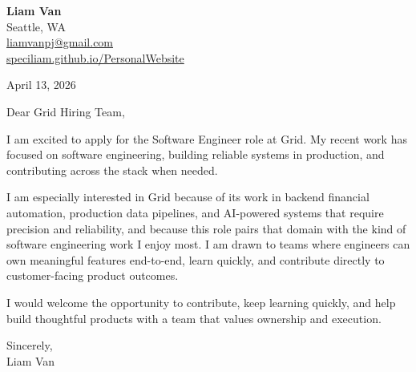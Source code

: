 \documentclass[letterpaper,11pt]{article}
\begin{document}
\begin{flushleft}
\textbf{\Large Liam Van} \\
Seattle, WA \\
\href{mailto:liamvanpj@gmail.com}{liamvanpj@gmail.com} \\
\href{https://speciliam.github.io/PersonalWebsite}{speciliam.github.io/PersonalWebsite}
\end{flushleft}

April 13, 2026

\noindent Dear Grid Hiring Team,

\noindent I am excited to apply for the Software Engineer role at Grid. My recent work has focused on software engineering, building reliable systems in production, and contributing across the stack when needed.

\noindent I am especially interested in Grid because of its work in backend financial automation, production data pipelines, and AI-powered systems that require precision and reliability, and because this role pairs that domain with the kind of software engineering work I enjoy most. I am drawn to teams where engineers can own meaningful features end-to-end, learn quickly, and contribute directly to customer-facing product outcomes.

\noindent I would welcome the opportunity to contribute, keep learning quickly, and help build thoughtful products with a team that values ownership and execution.

\noindent Sincerely, \\
Liam Van
\end{document}

